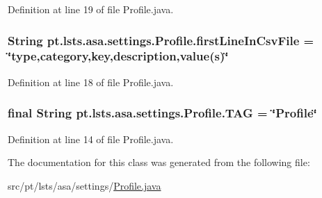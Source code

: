 Definition at line 19 of file Profile.\+java.

\hypertarget{classpt_1_1lsts_1_1asa_1_1settings_1_1Profile_a7d8087f7e815d9f9fc6e839e8d08d82c}{}
\subsubsection[{first\+Line\+In\+Csv\+File}]{\setlength{\rightskip}{0pt plus 5cm}String pt.\+lsts.\+asa.\+settings.\+Profile.\+first\+Line\+In\+Csv\+File = \char`\"{}type,category,key,description,value(s)\char`\"{}\hspace{0.3cm}{\ttfamily [static]}}\label{classpt_1_1lsts_1_1asa_1_1settings_1_1Profile_a7d8087f7e815d9f9fc6e839e8d08d82c}


Definition at line 18 of file Profile.\+java.

\hypertarget{classpt_1_1lsts_1_1asa_1_1settings_1_1Profile_a6e84bd737cf1fd83b07f0f306b70b710}{}
\subsubsection[{T\+A\+G}]{\setlength{\rightskip}{0pt plus 5cm}final String pt.\+lsts.\+asa.\+settings.\+Profile.\+T\+A\+G = \char`\"{}Profile\char`\"{}\hspace{0.3cm}{\ttfamily [static]}}\label{classpt_1_1lsts_1_1asa_1_1settings_1_1Profile_a6e84bd737cf1fd83b07f0f306b70b710}


Definition at line 14 of file Profile.\+java.



The documentation for this class was generated from the following file\+:\begin{DoxyCompactItemize}
\item 
src/pt/lsts/asa/settings/\hyperlink{Profile_8java}{Profile.\+java}\end{DoxyCompactItemize}
